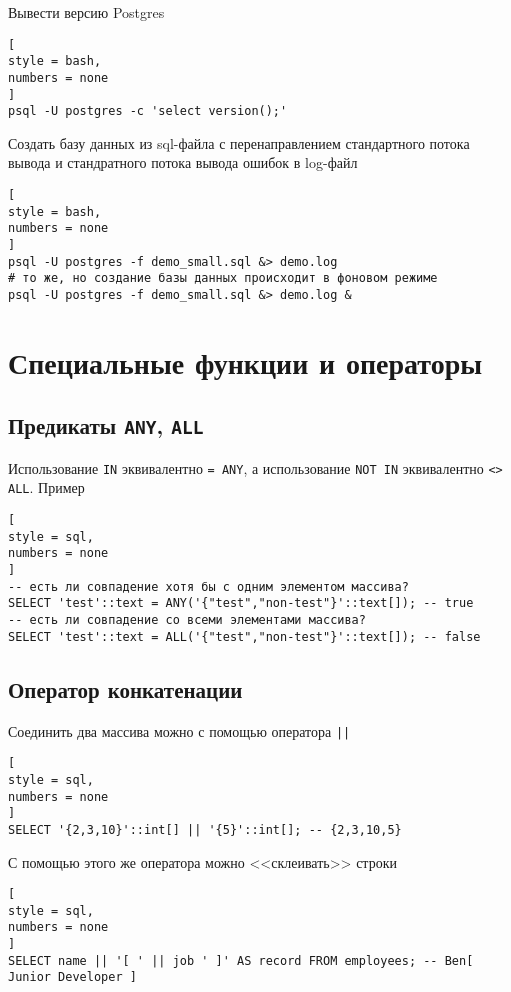 \documentclass[%
	11pt,
	a4paper,
	utf8,
		]{article}
\begin{document}
Вывести версию Postgres
\begin{lstlisting}[
style = bash,
numbers = none	
]
psql -U postgres -c 'select version();'
\end{lstlisting}

Создать  базу данных из sql-файла с перенаправлением стандартного потока вывода и стандратного потока вывода ошибок в log-файл
\begin{lstlisting}[
style = bash,
numbers = none	
]
psql -U postgres -f demo_small.sql &> demo.log
# то же, но создание базы данных происходит в фоновом режиме
psql -U postgres -f demo_small.sql &> demo.log &
\end{lstlisting}


\section{Специальные функции и операторы}

\subsection{Предикаты \texttt{ANY}, \texttt{ALL}}

Использование \texttt{IN} эквивалентно \texttt{= ANY}, а использование \texttt{NOT IN} эквивалентно \texttt{<> ALL}. Пример
\begin{lstlisting}[
style = sql,
numbers = none
]
-- есть ли совпадение хотя бы с одним элементом массива?
SELECT 'test'::text = ANY('{"test","non-test"}'::text[]); -- true
-- есть ли совпадение со всеми элементами массива?
SELECT 'test'::text = ALL('{"test","non-test"}'::text[]); -- false
\end{lstlisting}

\subsection{Оператор конкатенации}

Соединить два массива можно с помощью оператора \texttt{||} 
\begin{lstlisting}[
style = sql,
numbers = none
]
SELECT '{2,3,10}'::int[] || '{5}'::int[]; -- {2,3,10,5}
\end{lstlisting}

С помощью этого же оператора можно <<склеивать>> строки
\begin{lstlisting}[
style = sql,
numbers = none
]
SELECT name || '[ ' || job ' ]' AS record FROM employees; -- Ben[ Junior Developer ]
\end{lstlisting}
\end{document}
